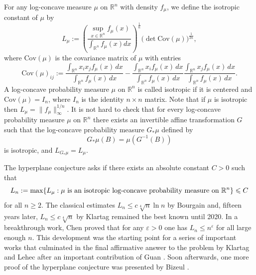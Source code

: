 \documentclass[11pt,leqno]{article}
\theoremstyle{definition}
\theoremstyle{remark}
\numberwithin{equation}{section}
\newcommand{\ls}{\leqslant}
\newcommand{\gr}{\geqslant}
\renewcommand{\epsilon}{\varepsilon}
\newcommand{\1}{\textbf{1}}
\begin{document}
For any log-concave measure $\mu$ on ${\mathbb R}^n$ with density $f_{\mu}$, we define the isotropic constant of $\mu $ by
\begin{equation*}
L_{\mu }:=\left (\frac{\sup_{x\in {\mathbb R}^n} f_{\mu} (x)}{\int_{{\mathbb
R}^n}f_{\mu}(x)dx}\right )^{\frac{1}{n}} \big(\det \textrm{Cov}(\mu)\big)^{\frac{1}{2n}},\end{equation*}
where $\textrm{Cov}(\mu)$ is the covariance matrix of $\mu$ with entries
\begin{equation*}\textrm{Cov}(\mu )_{ij}:=\frac{\int_{{\mathbb R}^n}x_ix_j f_{\mu}
(x)\,dx}{\int_{{\mathbb R}^n} f_{\mu} (x)\,dx}-\frac{\int_{{\mathbb
R}^n}x_i f_{\mu} (x)\,dx}{\int_{{\mathbb R}^n} f_{\mu}
(x)\,dx}\frac{\int_{{\mathbb R}^n}x_j f_{\mu}
(x)\,dx}{\int_{{\mathbb R}^n} f_{\mu} (x)\,dx}.\end{equation*}
A log-concave probability measure $\mu $ on ${\mathbb R}^n$
is called isotropic if it is centered and $\textrm{Cov}(\mu )=I_n$,
where $I_n$ is the identity $n\times n$ matrix. Note that if $\mu$ is isotropic then $L_{\mu }=\|f_{\mu }\|_{\infty }^{1/n}$.
It is not hard to check that for every log-concave probability measure $\mu $ on $\mathbb{R}^n$ there exists
an invertible affine transformation $G$ such that the log-concave probability measure $G_{\ast }\mu $ defined by
\begin{equation*}G_{\ast }\mu (B)=\mu (G^{-1}(B))\end{equation*}is isotropic,
and $L_{G_{\ast}\mu}=L_{\mu}$.

The hyperplane conjecture asks if there exists an absolute constant $C>0$ such that
\begin{equation*}L_n:= \max\{ L_{\mu }:\mu\ \hbox{is an isotropic log-concave probability measure on}\ {\mathbb R}^n\}\ls C\end{equation*}
for all $n\gr 2$. The classical estimates $L_n\ls c\sqrt[4]{n}\ln n$ by Bourgain \cite{Bourgain-1991}
and, fifteen years later, $L_n\ls c\sqrt[4]{n}$ by Klartag \cite{Klartag-2006} remained the best known until
2020. In a breakthrough work, Chen \cite{C} proved that for any $\epsilon >0$
one has $L_n\ls n^{\epsilon}$ for all large enough $n$. This development was the starting point for
a series of important works that culminated in the final affirmative answer to the problem
by Klartag and Lehec \cite{KL} after an important contribution of Guan \cite{Guan}. Soon afterwards, one more
proof of the hyperplane conjecture was presented by Bizeul \cite{Bizeul}.
\end{document}

